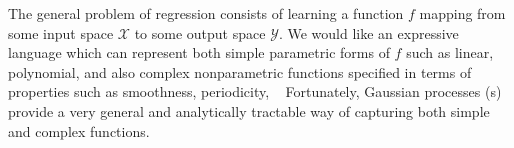 




The general problem of regression consists of learning a function $f$ mapping from some input space $\mathcal{X}$ to some output space $\mathcal{Y}$.
We would like an expressive language which can represent both simple parametric forms of $f$ such as linear, polynomial, \etc and also complex nonparametric functions specified in terms of properties such as smoothness, periodicity, \etc~
Fortunately, Gaussian processes (\gp{}s) provide a very general and analytically tractable way of capturing both simple and complex functions. 


